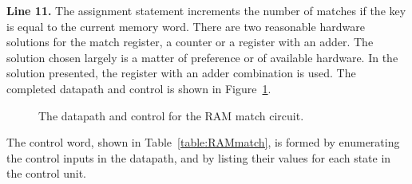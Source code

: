 \textbf{ Line 11.}  The assignment statement increments the number of
matches if the key is equal to the current memory word.  There
are two reasonable hardware solutions for the match register,
a counter or a register with an adder.  The solution chosen
largely is a matter of preference or of available hardware.
In the solution presented, the register with an adder
combination is used.  The completed datapath and control is shown in
Figure~\ref{fig:datapathControlRAMmatch}.

\begin{figure}[ht]
    \caption{The datapath and control for the RAM match circuit.}
    \label{fig:datapathControlRAMmatch}
\end{figure}

The control word, shown in Table~\ref{table:RAMmatch},
is formed by enumerating the control inputs in the datapath, and by
listing their values for each state in the control unit.

